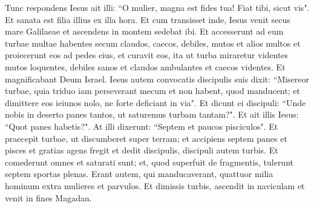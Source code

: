 \begin{biblechapter}
\verse Tunc respondens Iesus ait illi: “O mulier, magna est fides tua! Fiat tibi, sicut vis". Et sanata est filia illius ex illa hora. 
\verse Et cum transisset inde, Iesus venit secus mare Galilaeae et ascendens in montem sedebat ibi. 
\verse Et accesserunt ad eum turbae multae habentes secum claudos, caecos, debiles, mutos et alios multos et proiecerunt eos ad pedes eius, et curavit eos, 
\verse ita ut turba miraretur videntes mutos loquentes, debiles sanos et claudos ambulantes et caecos videntes. Et magnificabant Deum Israel. 
\verse Iesus autem convocatis discipulis suis dixit: “Misereor turbae, quia triduo iam perseverant mecum et non habent, quod manducent; et dimittere eos ieiunos nolo, ne forte deficiant in via". 
\verse Et dicunt ei discipuli: “Unde nobis in deserto panes tantos, ut saturemus turbam tantam?". 
\verse Et ait illis Iesus: “Quot panes habetis?". At illi dixerunt: “Septem et paucos pisciculos". 
\verse Et praecepit turbae, ut discumberet super terram; 
\verse et accipiens septem panes et pisces et gratias agens fregit et dedit discipulis, discipuli autem turbis. 
\verse Et comederunt omnes et saturati sunt; et, quod superfuit de fragmentis, tulerunt septem sportas plenas. 
\verse Erant autem, qui manducaverant, quattuor milia hominum extra mulieres et parvulos. 
\verse Et dimissis turbis, ascendit in naviculam et venit in fines Magadan. 
\end{biblechapter}

